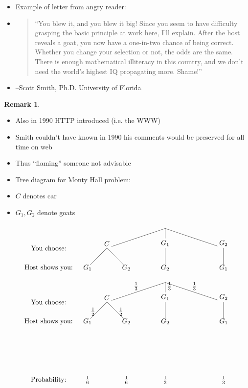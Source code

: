 \documentclass[handout]{beamer}
\theoremstyle{definition}
\newtheorem{remark}{Remark}
\begin{document}
\begin{frame}
\begin{itemize}
\item Example of letter from angry reader:
\item\begin{quotation}
``You blew it, and you blew it big! Since you seem to have difficulty
grasping the basic principle at work here, I'll explain. After the
host reveals a goat, you now have a one-in-two chance of being
correct. Whether you change your selection or not, the odds are the
same. There is enough mathematical illiteracy in this country, and
we don't need the world's highest IQ propagating more. Shame!''
\end{quotation}
\item[] --Scott Smith, Ph.D. University of Florida
\end{itemize}
\begin{remark}
\begin{itemize}
\item Also in 1990 HTTP introduced (i.e. the WWW)
\item Smith couldn't have known in 1990 his comments
would be preserved for all time on web
\item Thus ``flaming'' someone not advisable
\end{itemize}
\end{remark}
\end{frame}

\begin{frame}
\begin{itemize}
\item Tree diagram for Monty Hall problem:
\item \alert{$C$} denotes car
\item \alert{$G_1,G_2$} denote goats
\end{itemize}
\[\begin{xy}<1cm,0cm>:
(-6,-1)*{\text{You choose:}};
(-6,-2)*{\text{Host shows you:}};
(0,0)="0";
(-3,-1)="-31";
(0,-1)="01";
(3,-1)="31";
"0";"-31"*+!D{C}**\dir{-};
"0";"01"*+!D{G_1}**\dir{-};
"0";"31"*+!D{G_2}**\dir{-};
"-31";(-4,-2)*{G_1}**\dir{-};
"-31";(-2,-2)*{G_2}**\dir{-};
"01";(0,-2)*{G_2}**\dir{-};
"31";(3,-2)*{G_1}**\dir{-};
\end{xy}\]
\end{frame}

\begin{frame}
\[\begin{xy}<1cm,0cm>:
(-6,-1)*{\text{You choose:}};
(-6,-2)*{\text{Host shows you:}};
(-6,-5)*{\text{Probability:}};
(0,0)="0";
(-3,-1)="-31";
(0,-1)="01";
(3,-1)="31";
"0";"-31"*+!D{C}**\dir{-}?*+!D{\frac{1}{3}};
"0";"01"*+!D{G_1}**\dir{-}?*+!DL{\frac{1}{3}};
"0";"31"*+!D{G_2}**\dir{-}?*+!D{\frac{1}{3}};
"-31";(-4,-2)*{G_1}**\dir{-}?*+!R{\frac{1}{2}};
"-31";(-2,-2)*{G_2}**\dir{-}?*+!L{\frac{1}{2}};
"01";(0,-2)*{G_2}**\dir{-};
"31";(3,-2)*{G_1}**\dir{-};
(-4,-5)*{\frac{1}{6}};(-2,-5)*{\frac{1}{6}};
(0,-5)*{\frac{1}{3}};(3,-5)*{\frac{1}{3}};
\end{xy}\]
\end{frame}
\end{document}

